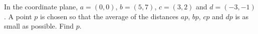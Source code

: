 In the coordinate plane, $a=(0,0)$, $b=(5,7)$, $c=(3,2)$ and $d=(-3,-1)$. A point $p$ is chosen so that the average of the distances $ap$, $bp$, $cp$ and $dp$ is as small as possible. Find $p$.
